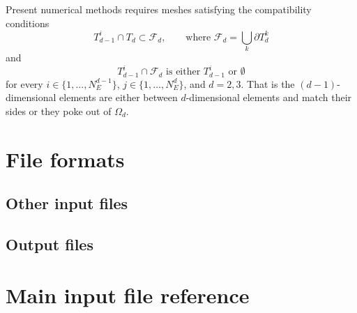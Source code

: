 \documentclass[12pt,a4paper]{report}
\begin{document}
Present numerical methods requires meshes satisfying the compatibility conditions
\begin{equation}
        T_{d-1}^i \cap T_d \subset \mathcal{F}_d,   \qquad \text{where } \mathcal{F}_d = \bigcup_{k} \partial T_{d}^{k}
\end{equation}
and
\begin{equation}
        T_{d-1}^i \cap \mathcal{F}_d    \text{ is either $T_{d-1}^i$ or $\emptyset$}    
\end{equation}
for every $i\in\{1,\dots, N_{E}^{d-1}\}$, $j\in\{1,\dots,N_{E}^{d}\}$,  and $d=2,3$. That is the $(d-1)$-dimensional elements are either between $d$-dimensional elements and
match their sides or they poke out of $\Omega_d$. 






%


%
%


\chapter{File formats}


\section{Other input files}


\section{Output files}

% 
%   


%

\chapter{Main input file reference}







\end{document}

